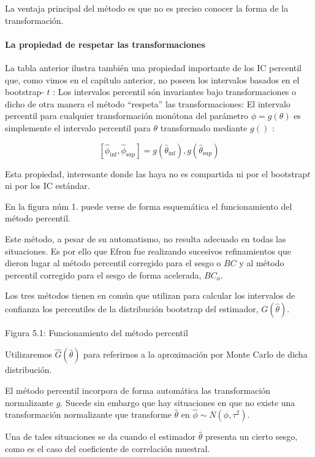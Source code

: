 \documentclass[
]{article}
\begin{document}
La ventaja principal del método es que no es preciso conocer la forma de la transformación.

\paragraph{La propiedad de respetar las transformaciones}\label{la-propiedad-de-respetar-las-transformaciones}

La tabla anterior ilustra también una propiedad importante de los IC percentil que, como vimos en el capítulo anterior, no poseen los intervalos basados en el bootstrap- \(t\) : Los intervalos percentil són invariantes bajo transformaciones o dicho de otra manera el método ``respeta'' las transformaciones: El intervalo percentil para cualquier transformación monótona del parámetro \(\phi=g(\theta)\) es simplemente el intervalo percentil para \(\theta\) transformado mediante \(g()\) :

\[
\left[\hat{\phi}_{\mathrm{inf}}, \hat{\phi}_{\mathrm{sup}}\right]=g\left(\hat{\theta}_{\mathrm{inf}}\right), g\left(\hat{\theta}_{\mathrm{sup}}\right)
\]

Esta propiedad, interesante donde las haya no es compartida ni por el bootstrap\(t\) ni por los IC estándar.

En la figura núm 1. puede verse de forma esquemática el funcionamiento del método percentil.

Este método, a pesar de su automatismo, no resulta adecuado en todas las situaciones. Es por ello que Efron fue realizando sucesivos refinamientos que dieron lugar al método percentil corregido para el sesgo o \(B C\) y al método percentil corregido para el sesgo de forma acelerada, \(B C_{a}\).

Los tres métodos tienen en común que utilizan para calcular los intervalos de confianza los percentiles de la distribución bootstrap del estimador, \(G(\hat{\theta})\).

Figura 5.1: Funcionamiento del método percentil

Utilizaremos \(\hat{G}(\hat{\theta})\) para referirnos a la aproximación por Monte Carlo de dicha distribución.

El método percentil incorpora de forma automática las transformación normalizante \(g\). Sucede sin embargo que hay situaciones en que no existe una transformación normalizante que transforme \(\hat{\theta}\) en \(\hat{\phi} \sim N\left(\phi, \tau^{2}\right)\).

Una de tales situaciones se da cuando el estimador \(\hat{\theta}\) presenta un cierto sesgo, como es el caso del coeficiente de correlación muestral.
\end{document}
